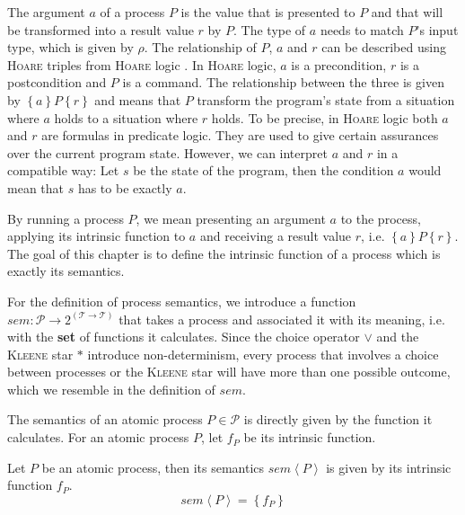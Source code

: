 The argument $a$ of a process $P$ is the value that is presented to $P$ and that will be transformed into a result value $r$ by $P$. The type of $a$ needs to match $P$'s input type, which is given by $\rho$. The relationship of $P$, $a$ and $r$ can be described using \textsc{Hoare} triples from \textsc{Hoare} logic \cite{}. In \textsc{Hoare} logic, $a$ is a precondition, $r$ is a postcondition and $P$ is a command. The relationship between the three is given by $\left\{ a \right\} P \left\{ r \right\}$ and means that $P$ transform the program's state from a situation where $a$ holds to a situation where $r$ holds. To be precise, in \textsc{Hoare} logic both $a$ and $r$ are formulas in predicate logic. They are used to give certain assurances over the current program state. However, we can interpret $a$ and $r$ in a compatible way: Let $s$ be the state of the program, then the condition $a$ would mean that $s$ has to be exactly $a$.

By running a process $P$, we mean presenting an argument $a$ to the process, applying its intrinsic function to $a$ and receiving a result value $r$, i.e. $\left\{ a \right\} P \left\{ r \right\}$. The goal of this chapter is to define the intrinsic function of a process which is exactly its semantics.

For the definition of process semantics, we introduce a function $sem \colon \mathcal{P} \to 2^{\left( \mathcal{T} \to \mathcal{T} \right)}$ that takes a process and associated it with its meaning, i.e. with the \textbf{set} of functions it calculates. Since the choice operator $\vee$ and the \textsc{Kleene} star $*$ introduce non-determinism, every process that involves a choice between processes or the \textsc{Kleene} star will have more than one possible outcome, which we resemble in the definition of $sem$.


The semantics of an atomic process $P \in \mathcal{P}$ is directly given by the function it calculates. For an atomic process $P$, let $f_P$ be its intrinsic function.
\begin{definition}
  \label{def:sem_atomic}
  Let $P$ be an atomic process, then its semantics $sem \left\langle P \right\rangle$ is given by its intrinsic function $f_P$.
  \begin{equation}
    \label{eqn:sem_atomic}
    sem \left\langle P \right\rangle = \left\{ f_P \right\}
  \end{equation}
  \hfill\qedsymbol
\end{definition}

